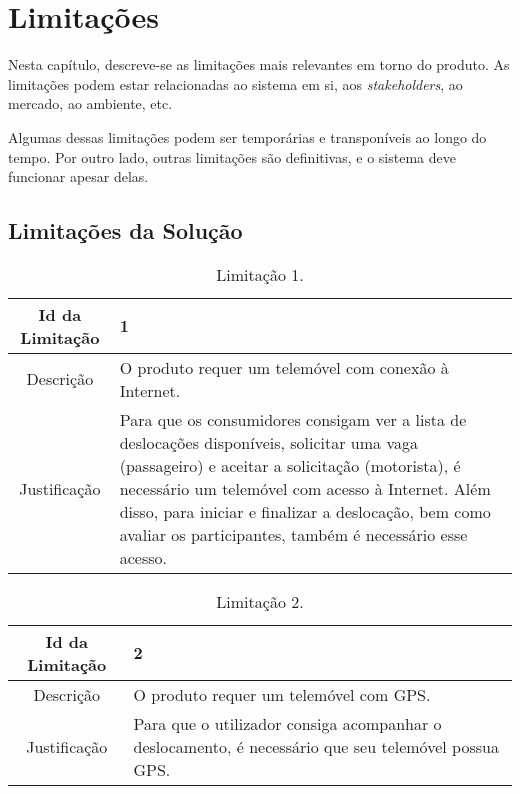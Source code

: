\chapter{Limitações}
\hspace{5mm} Nesta capítulo, descreve-se as limitações mais relevantes em torno do produto. As limitações podem estar relacionadas ao sistema em si, aos \emph{stakeholders}, ao mercado, ao ambiente, etc.

\hspace{5mm} Algumas dessas limitações podem ser temporárias e transponíveis ao longo do tempo. Por outro lado, outras limitações são definitivas, e o sistema deve funcionar apesar delas.

\section{Limitações da Solução}\label{0:0.3.1}

\begin{table}[!h]
\begin{center}
\begin{tabularx}{\textwidth}{ | c | X | }
\hline
  Id da Limitação & 1  \\
  \hline
  Descrição & O produto requer um telemóvel com conexão à Internet. \\
  \hline
  Justificação & Para que os consumidores consigam ver a lista de deslocações disponíveis, solicitar uma vaga (passageiro) e aceitar a solicitação (motorista), é necessário um  telemóvel com acesso à Internet. Além disso, para iniciar e finalizar a deslocação, bem como avaliar os participantes, também é necessário esse acesso. \\
  \hline
\end{tabularx}
\caption{Limitação 1.} \label{tab:r1}
\end{center}
\end{table}

\begin{table}[!h]
\begin{center}
    \begin{tabularx}{\textwidth}{ | c | X | }
        \hline
        Id da Limitação & 2 \\
        \hline
        Descrição & O produto requer um telemóvel com GPS. \\
        \hline
        Justificação & Para que o utilizador consiga acompanhar o deslocamento, é necessário que seu telemóvel possua GPS. \\
        \hline
    \end{tabularx}
    \caption{Limitação 2.} \label{tab:r2}
\end{center}
\end{table}

